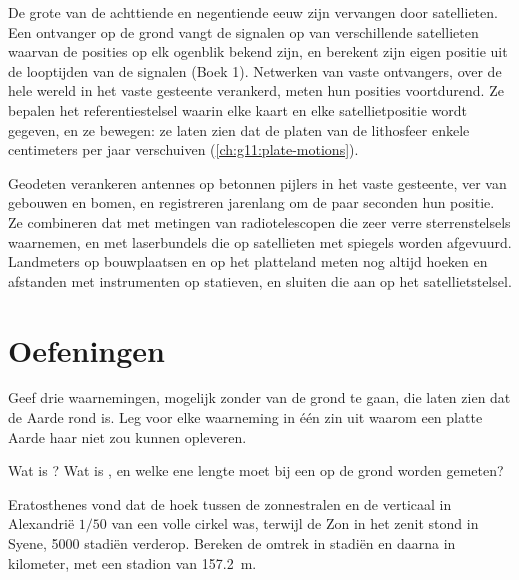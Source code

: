 De grote  van de achttiende en negentiende eeuw zijn vervangen
door satellieten. Een ontvanger op de grond vangt de signalen op van
verschillende satellieten waarvan de posities op elk ogenblik bekend zijn, en
berekent zijn eigen positie uit de looptijden van de signalen (Boek 1).
Netwerken van vaste ontvangers, over de hele wereld in het vaste gesteente
verankerd, meten hun posities voortdurend. Ze bepalen het referentiestelsel
waarin elke kaart en elke satellietpositie wordt gegeven, en ze bewegen: ze
laten zien dat de platen van de lithosfeer enkele centimeters per jaar
verschuiven (\cref{ch:g11:plate-motions}).

\begin{inthefield}
Geodeten verankeren antennes op betonnen pijlers in het vaste gesteente, ver
van gebouwen en bomen, en registreren jarenlang om de paar seconden hun
positie. Ze combineren dat met metingen van radiotelescopen die zeer verre
sterrenstelsels waarnemen, en met laserbundels die op satellieten met
spiegels worden afgevuurd. Landmeters op bouwplaatsen en op het platteland
meten nog altijd hoeken en afstanden met instrumenten op statieven, en sluiten
die aan op het satellietstelsel.
\end{inthefield}

\section{Oefeningen}

\begin{exercise}[$\star$]\label{exo:g10:measuring-the-earth:1}
Geef drie waarnemingen, mogelijk zonder van de grond te gaan, die laten zien
dat de Aarde rond is. Leg voor elke waarneming in één zin uit waarom een platte
Aarde haar niet zou kunnen opleveren.
\end{exercise}

\begin{exercise}[$\star$]\label{exo:g10:measuring-the-earth:2}
Wat is ? Wat is , en welke ene lengte moet bij een
 op de grond worden gemeten?
\end{exercise}

\begin{exercise}[$\star$]\label{exo:g10:measuring-the-earth:3}
Eratosthenes vond dat de hoek tussen de zonnestralen en de verticaal in
Alexandrië $1/50$ van een volle cirkel was, terwijl de Zon in het zenit stond in
Syene, 5000 stadiën verderop. Bereken de omtrek in stadiën en daarna in
kilometer, met een stadion van \qty{157.2}{m}.
\end{exercise}

